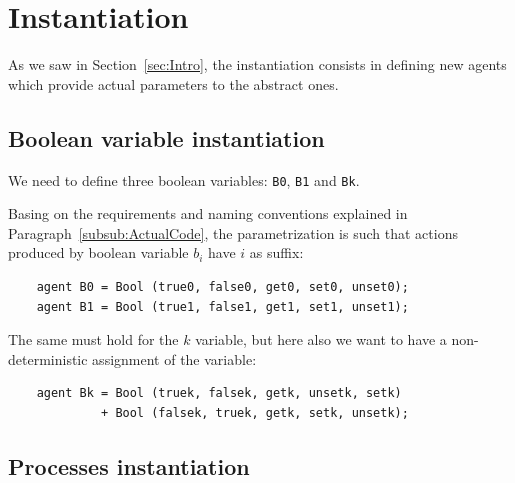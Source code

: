 \documentclass[10pt,a4paper]{article}
\newcommand{\Agent}[1]{{\tt {#1}}}
\begin{document}
\section{Instantiation}
\label{sec:Instantiation}

    As we saw in Section~\ref{sec:Intro}, the instantiation consists in
    defining new agents which provide actual parameters to the abstract
    ones.

    \subsection{Boolean variable instantiation}

        We need to define three boolean variables: \Agent{B0},
        \Agent{B1} and \Agent{Bk}.

        Basing on the requirements and naming conventions explained in
        Paragraph~\ref{subsub:ActualCode}, the parametrization is such
        that actions produced by boolean variable $b_i$ have $i$ as
        suffix:
        \begin{verbatim}
    agent B0 = Bool (true0, false0, get0, set0, unset0);
    agent B1 = Bool (true1, false1, get1, set1, unset1);
        \end{verbatim}

        The same must hold for the $k$ variable, but here also we want to
        have a non-deterministic assignment of the variable:
        \begin{verbatim}
    agent Bk = Bool (truek, falsek, getk, unsetk, setk)
             + Bool (falsek, truek, getk, setk, unsetk);
        \end{verbatim}

    \subsection{Processes instantiation}
\end{document}
